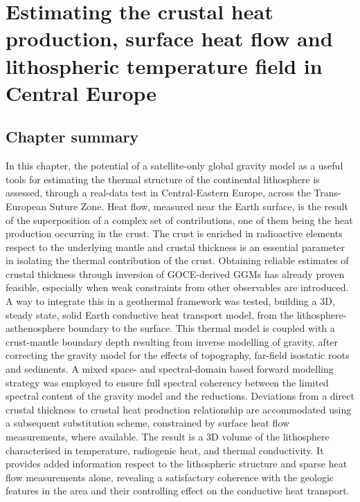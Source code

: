 \chapter[
	tocentry={Crustal heat production, heat flow and temperature in Central Europe},
	head={Crustal RHP, heat flow and temperature field in Central Europe}]{Estimating the crustal heat production, surface heat flow and lithospheric temperature field in Central Europe}
\label{c:ThermAppl}

\section*{Chapter summary}
\label{s:Appl:Summary}
In this chapter, the potential of a satellite-only global gravity model as a useful tools for estimating the thermal structure of the continental lithosphere is assessed, through a real-data test in Central-Eastern Europe, across the Trans-European Suture Zone.
Heat flow, measured near the Earth surface, is the result of the superposition of a complex set of contributions, one of them being the heat production occurring in the crust.
The crust is enriched in radioactive elements respect to the underlying mantle and crustal thickness is an essential parameter in isolating the thermal contribution of the crust.
Obtaining reliable estimates of crustal thickness through inversion of GOCE-derived GGMs has already proven feasible, especially when weak constraints from other observables are introduced.
A way to integrate this in a geothermal framework was tested, building a 3D, steady state, solid Earth conductive heat transport model, from the lithosphere-asthenosphere boundary to the surface.
This thermal model is coupled with a crust-mantle boundary depth resulting from inverse modelling of gravity, after correcting the gravity model for the effects of topography, far-field isostatic roots and sediments.
A mixed space- and spectral-domain based forward modelling strategy was employed to ensure full spectral coherency between the limited spectral content of the gravity model and the reductions.
Deviations from a direct crustal thickness to crustal heat production relationship are accommodated using a subsequent substitution scheme, constrained by surface heat flow measurements, where available.
The result is a 3D volume of the lithosphere characterised in temperature, radiogenic heat, and thermal conductivity.
It provides added information respect to the lithospheric structure and sparse heat flow measurements alone, revealing a satisfactory coherence with the geologic features in the area and their controlling effect on the conductive heat transport.

